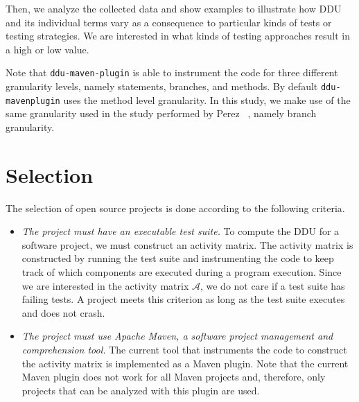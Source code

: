 \documentclass[twoside,a4paper,11pt]{memoir}
\begin{document}
Then, we analyze the collected data and show examples to illustrate how DDU and its individual terms vary as a consequence to particular kinds of tests or testing strategies.
We are interested in what kinds of testing approaches result in a high or low value.

Note that \texttt{ddu-maven-plugin} is able to instrument the code for three different granularity levels, namely statements, branches, and methods.
By default \texttt{ddu-maven\-plugin} uses the method level granularity.
In this study, we make use of the same granularity used in the study performed by Perez \etal~\cite{DBLP:conf/icse/PerezAD17}, namely branch granularity.

\section{Selection}
The selection of open source projects is done according to the following criteria.
\begin{itemize}[noitemsep]
  \item \emph{The project must have an executable test suite.}
  To compute the DDU for a software project, we must construct an activity matrix.
  The activity matrix is constructed by running the test suite and instrumenting the code to keep track of which components are executed during a program execution.
  Since we are interested in the activity matrix \(\mathcal{A}\), we do not care if a test suite has failing tests.
  A project meets this criterion as long as the test suite executes and does not crash.

  \item \emph{The project must use Apache Maven, a software project management and comprehension tool.}
  The current tool that instruments the code to construct the activity matrix is implemented as a Maven plugin.
  Note that the current Maven plugin does not work for all Maven projects and, therefore, only projects that can be analyzed with this plugin are used.
\end{itemize}
\end{document}
